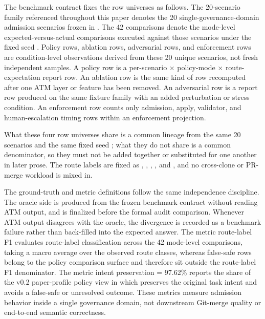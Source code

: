 \documentclass[9pt,letterpaper]{extarticle}
\begin{document}
The benchmark contract fixes the row universes as follows. The 20-scenario family referenced throughout this paper denotes the 20 single-governance-domain admission scenarios frozen in \texttt{}. The 42 comparisons denote the mode-level expected-versus-actual comparisons executed against those scenarios under the fixed seed \texttt{}. Policy rows, ablation rows, adversarial rows, and enforcement rows are condition-level observations derived from these 20 unique scenarios, not fresh independent samples. A policy row is a per-scenario $\times$ policy-mode $\times$ route-expectation report row. An ablation row is the same kind of row recomputed after one ATM layer or feature has been removed. An adversarial row is a report row produced on the same fixture family with an added perturbation or stress condition. An enforcement row counts only admission, apply, validator, and human-escalation timing rows within an enforcement projection.

What these four row universes share is a common lineage from the same 20 scenarios and the same fixed seed \texttt{}; what they do not share is a common denominator, so they must not be added together or substituted for one another in later prose. The route labels are fixed as \texttt{}, \texttt{}, \texttt{}, \texttt{}, and \texttt{}, and no cross-clone or PR-merge workload is mixed in.

The ground-truth and metric definitions follow the same independence discipline. The oracle side is produced from the frozen benchmark contract without reading ATM output, and is finalized before the formal audit comparison. Whenever ATM output disagrees with the oracle, the divergence is recorded as a benchmark failure rather than back-filled into the expected answer. The metric route-label F1 evaluates route-label classification across the 42 mode-level comparisons, taking a macro average over the observed route classes, whereas false-safe rows belong to the policy comparison surface and therefore sit outside the route-label F1 denominator. The metric intent preservation = 97.62\% reports the share of the v0.2 paper-profile policy view in which \texttt{} preserves the original task intent and avoids a false-safe or unresolved outcome. These metrics measure admission behavior inside a single governance domain, not downstream Git-merge quality or end-to-end semantic correctness.
\end{document}
